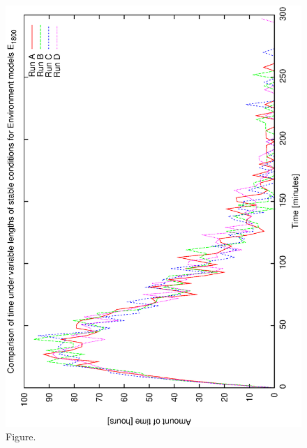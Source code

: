 \documentclass[12pt,a4paper]{article}
\begin{document}
\begin{figure}[htbp]
 \begin{center}
  \includegraphics[scale=1.0, angle=0]{figures/e_18_comp.eps}
 \end{center}
  \caption[Figure.]
{Figure.}
\end{figure}
\clearpage
\end{document}
